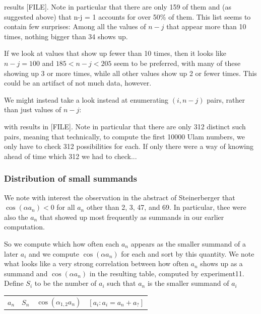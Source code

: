 \documentclass{article}
\theoremstyle{definition}
\theoremstyle{remark}
\numberwithin{equation}{section}
\begin{document}
{results [FILE].  Note in particular that there are only 159 of them
and (as suggested above) that n-j = 1 accounts for over 50\% of them.
This list seems to contain few surprises: Among all the values of $n-j$
that appear more than 10 times, nothing bigger than 34 shows up.

If we look at values that show up fewer than 10 times, then it looks
like $n-j = 100$ and $185 < n-j < 205$ seem to be preferred, with many
of these showing up 3 or more times, while all other values show up 2
or fewer times.  This could be an artifact of not much data, however.

We might instead take a look instead at enumerating $(i,n-j)$ pairs,
rather than just values of $n-j$:


with results in [FILE].  Note in particular that there are
only 312 distinct such pairs, meaning that technically, to compute the
first 10000 Ulam numbers, we only have to check 312 possibilities for
each.  If only there were a way of knowing ahead of time which 312 we
had to check...

\subsubsection{Distribution of small summands}

We note with interest the observation in the abstract of Steinerberger
that $\cos(\alpha a_n) < 0$ for all $a_n$ other than 2, 3, 47, and 69.  In
particular, thee were also the $a_n$ that showed up most frequently as
summands in our earlier computation.

So we compute which how often each $a_n$ appears as the smaller
summand of a later $a_i$ and we compute $\cos(\alpha a_n)$ for each
and sort by this quantity.  We note what looks like a very strong
correlation between how often $a_n$ shows up as a summand and
$\cos(\alpha a_n)$ in the resulting table, computed by experiment11.
Define $S_i$ to be the number of $a_i$ such that $a_n$ is the smaller
summand of $a_i$

\begin{tabular}{llll}
$a_n$ & $S_n$ & $\cos(\alpha_{1,2}  a_n)$ & $[a_i : a_i = a_n + a_?]$\\


\end{tabular}}
\end{document}
